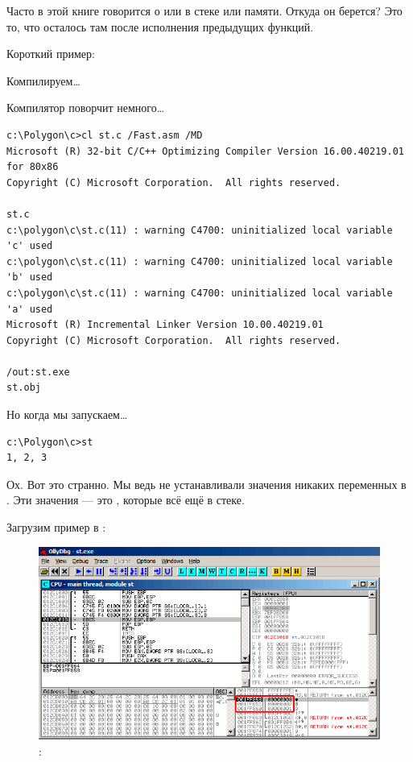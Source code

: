 
Часто в этой книге говорится о  или  в стеке или памяти.
Откуда он берется?
Это то, что осталось там после исполнения предыдущих функций.

Короткий пример:



Компилируем\dots



Компилятор поворчит немного\dots

\begin{lstlisting}
c:\Polygon\c>cl st.c /Fast.asm /MD
Microsoft (R) 32-bit C/C++ Optimizing Compiler Version 16.00.40219.01 for 80x86
Copyright (C) Microsoft Corporation.  All rights reserved.

st.c
c:\polygon\c\st.c(11) : warning C4700: uninitialized local variable 'c' used
c:\polygon\c\st.c(11) : warning C4700: uninitialized local variable 'b' used
c:\polygon\c\st.c(11) : warning C4700: uninitialized local variable 'a' used
Microsoft (R) Incremental Linker Version 10.00.40219.01
Copyright (C) Microsoft Corporation.  All rights reserved.

/out:st.exe
st.obj
\end{lstlisting}

Но когда мы запускаем\dots

\begin{lstlisting}
c:\Polygon\c>st
1, 2, 3
\end{lstlisting}

Ох. Вот это странно. Мы ведь не устанавливали значения никаких переменных в . 
Эти значения --- это , которые всё ещё в стеке.

\clearpage
Загрузим пример в \olly:

\begin{figure}[H]
\centering
\includegraphics[scale=\FigScale]{patterns/02_stack/08_noise/olly1.png}
\caption{\olly: }
\label{fig:stack_noise_olly1}
\end{figure}

